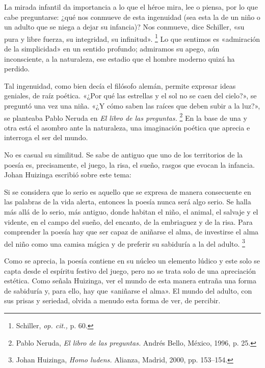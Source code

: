 \documentclass[14pt,twoside,final]{extbook} %
\let\oldfootnote\footnote
\renewcommand\footnote[1]{%
\oldfootnote{\hspace{1mm}#1}}
\begin{document}
La mirada infantil da importancia a lo que el héroe mira, lee o piensa, por lo que cabe preguntarse: ¿qué nos conmueve de esta ingenuidad (sea esta la de un niño o un adulto que se niega a dejar su infancia)? Nos conmueve, dice Schiller, «su pura y libre fuerza, su integridad, su infinitud».\footnote{Schiller, \emph{op. cit.,} p. 60.} Lo que sentimos es «admiración de la simplicidad» en un sentido profundo; admiramos su apego, aún inconsciente, a la naturaleza, ese estadio que el hombre moderno quizá ha perdido.

Tal ingenuidad, como bien decía el filósofo alemán, permite expresar ideas geniales, de raíz poética. «¿Por qué las estrellas y el sol no se caen del cielo?», se preguntó una vez una niña. «¿Y cómo saben las raíces que deben subir a la luz?», se planteaba Pablo Neruda en \emph{El libro de las preguntas.}\footnote{Pablo Neruda, \emph{El libro de las preguntas.} Andrés Bello, México, 1996, p. 25.} En la base de una y otra está el asombro ante la naturaleza, una imaginación poética que aprecia e interroga el ser del mundo.

No es casual su similitud. Se sabe de antiguo que uno de los territorios de la poesía es, precisamente, el juego, la risa, el sueño, rasgos que evocan la infancia. Johan Huizinga escribió sobre este tema:
\begin{quoting}
Si se considera que lo serio es aquello que se expresa de manera consecuente en las palabras de la vida alerta, entonces la poesía nunca será algo serio. Se halla más allá de lo serio, más antiguo, donde habitan el niño, el animal, el salvaje y el vidente, en el campo del sueño, del encanto, de la embriaguez y de la risa. Para comprender la poesía hay que ser capaz de aniñarse el alma, de investirse el alma del niño como una camisa mágica y de preferir su sabiduría a la del adulto.\footnote{Johan Huizinga, \emph{Homo ludens.} Alianza, Madrid, 2000, pp. 153--154.}
\end{quoting}
Como se aprecia, la poesía contiene en su núcleo un elemento lúdico y este solo se capta desde el espíritu festivo del juego, pero no se trata solo de una apreciación estética. Como señala Huizinga, ver el mundo de esta manera entraña una forma de sabiduría y, para ello, hay que «aniñarse el alma». El mundo del adulto, con sus prisas y seriedad, olvida a menudo esta forma de ver, de percibir.
\end{document}
